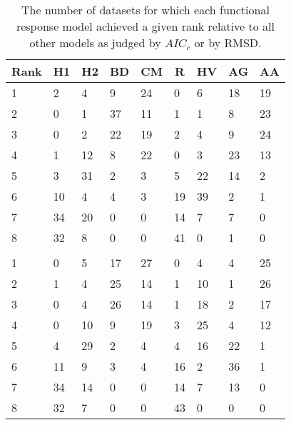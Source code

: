 \begin{table}[!tbp]
\caption{The number of datasets for which each functional response model achieved a given rank relative to all other models as judged by $AIC_c$ or by RMSD.\label{table:AICc_and_RMSD_rankings}} 
\begin{center}
\begin{tabular}{lllllllll}
\hline\hline
\multicolumn{1}{l}{Rank}&\multicolumn{1}{c}{H1}&\multicolumn{1}{c}{H2}&\multicolumn{1}{c}{BD}&\multicolumn{1}{c}{CM}&\multicolumn{1}{c}{R}&\multicolumn{1}{c}{HV}&\multicolumn{1}{c}{AG}&\multicolumn{1}{c}{AA}\tabularnewline
\hline
1&2&4&9&24&0&6&18&19\tabularnewline
2&0&1&37&11&1&1&8&23\tabularnewline
3&0&2&22&19&2&4&9&24\tabularnewline
4&1&12&8&22&0&3&23&13\tabularnewline
5&3&31&2&3&5&22&14&2\tabularnewline
6&10&4&4&3&19&39&2&1\tabularnewline
7&34&20&0&0&14&7&7&0\tabularnewline
8&32&8&0&0&41&0&1&0\tabularnewline
&&&&&&&&\tabularnewline
1&0&5&17&27&0&4&4&25\tabularnewline
2&1&4&25&14&1&10&1&26\tabularnewline
3&0&4&26&14&1&18&2&17\tabularnewline
4&0&10&9&19&3&25&4&12\tabularnewline
5&4&29&2&4&4&16&22&1\tabularnewline
6&11&9&3&4&16&2&36&1\tabularnewline
7&34&14&0&0&14&7&13&0\tabularnewline
8&32&7&0&0&43&0&0&0\tabularnewline
\hline
\end{tabular}\end{center}
\end{table}
